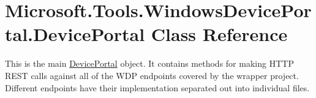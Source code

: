 \hypertarget{class_microsoft_1_1_tools_1_1_windows_device_portal_1_1_device_portal}{}\section{Microsoft.\+Tools.\+Windows\+Device\+Portal.\+Device\+Portal Class Reference}
\label{class_microsoft_1_1_tools_1_1_windows_device_portal_1_1_device_portal}


This is the main \hyperlink{class_microsoft_1_1_tools_1_1_windows_device_portal_1_1_device_portal}{Device\+Portal} object. It contains methods for making H\+T\+TP R\+E\+ST calls against all of the W\+DP endpoints covered by the wrapper project. Different endpoints have their implementation separated out into individual files.  


